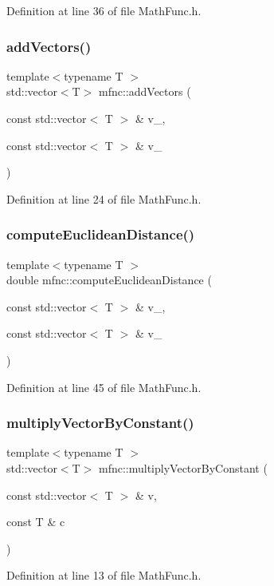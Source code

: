 Definition at line 36 of file Math\+Func.\+h.

\mbox{\label{namespacemfnc_a6445251f22e7f48b6ff9aa316064f7ce}} 
\subsubsection{add\+Vectors()}
{\footnotesize\ttfamily template$<$typename T $>$ \\
std\+::vector$<$T$>$ mfnc\+::add\+Vectors (\begin{DoxyParamCaption}\item[{const std\+::vector$<$ T $>$ \&}]{v\+\_,  }\item[{const std\+::vector$<$ T $>$ \&}]{v\+\_ }\end{DoxyParamCaption})}



Definition at line 24 of file Math\+Func.\+h.

\mbox{\label{namespacemfnc_a028c499f49e096bd33ed083c81045b53}} 
\subsubsection{compute\+Euclidean\+Distance()}
{\footnotesize\ttfamily template$<$typename T $>$ \\
double mfnc\+::compute\+Euclidean\+Distance (\begin{DoxyParamCaption}\item[{const std\+::vector$<$ T $>$ \&}]{v\+\_,  }\item[{const std\+::vector$<$ T $>$ \&}]{v\+\_ }\end{DoxyParamCaption})}



Definition at line 45 of file Math\+Func.\+h.

\mbox{\label{namespacemfnc_a1df6ec0d60567242f173c458ed6fbdb0}} 
\subsubsection{multiply\+Vector\+By\+Constant()}
{\footnotesize\ttfamily template$<$typename T $>$ \\
std\+::vector$<$T$>$ mfnc\+::multiply\+Vector\+By\+Constant (\begin{DoxyParamCaption}\item[{const std\+::vector$<$ T $>$ \&}]{v,  }\item[{const T \&}]{c }\end{DoxyParamCaption})}



Definition at line 13 of file Math\+Func.\+h.


